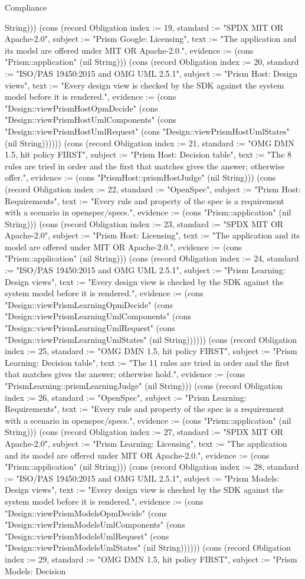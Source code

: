 \begin{lexlean}{Compliance}
\begin{semanticmodule}
{String))}) (cons (record Obligation {index := 19, standard := "SPDX MIT OR Apache-2.0", subject := "Prism Google: Licensing", text := "The application and its model are offered under MIT OR Apache-2.0.", evidence := (cons "Prism::application" (nil String))}) (cons (record Obligation {index := 20, standard := "ISO/PAS 19450:2015 and OMG UML 2.5.1", subject := "Prism Host: Design views", text := "Every design view is checked by the SDK against the system model before it is rendered.", evidence := (cons "Design::viewPrismHostOpmDecide" (cons "Design::viewPrismHostUmlComponents" (cons "Design::viewPrismHostUmlRequest" (cons "Design::viewPrismHostUmlStates" (nil String)))))}) (cons (record Obligation {index := 21, standard := "OMG DMN 1.5, hit policy FIRST", subject := "Prism Host: Decision table", text := "The 8 rules are tried in order and the first that matches gives the answer; otherwise offer.", evidence := (cons "PrismHost::prismHostJudge" (nil String))}) (cons (record Obligation {index := 22, standard := "OpenSpec", subject := "Prism Host: Requirements", text := "Every rule and property of the spec is a requirement with a scenario in openspec/specs.", evidence := (cons "Prism::application" (nil String))}) (cons (record Obligation {index := 23, standard := "SPDX MIT OR Apache-2.0", subject := "Prism Host: Licensing", text := "The application and its model are offered under MIT OR Apache-2.0.", evidence := (cons "Prism::application" (nil String))}) (cons (record Obligation {index := 24, standard := "ISO/PAS 19450:2015 and OMG UML 2.5.1", subject := "Prism Learning: Design views", text := "Every design view is checked by the SDK against the system model before it is rendered.", evidence := (cons "Design::viewPrismLearningOpmDecide" (cons "Design::viewPrismLearningUmlComponents" (cons "Design::viewPrismLearningUmlRequest" (cons "Design::viewPrismLearningUmlStates" (nil String)))))}) (cons (record Obligation {index := 25, standard := "OMG DMN 1.5, hit policy FIRST", subject := "Prism Learning: Decision table", text := "The 11 rules are tried in order and the first that matches gives the answer; otherwise hold.", evidence := (cons "PrismLearning::prismLearningJudge" (nil String))}) (cons (record Obligation {index := 26, standard := "OpenSpec", subject := "Prism Learning: Requirements", text := "Every rule and property of the spec is a requirement with a scenario in openspec/specs.", evidence := (cons "Prism::application" (nil String))}) (cons (record Obligation {index := 27, standard := "SPDX MIT OR Apache-2.0", subject := "Prism Learning: Licensing", text := "The application and its model are offered under MIT OR Apache-2.0.", evidence := (cons "Prism::application" (nil String))}) (cons (record Obligation {index := 28, standard := "ISO/PAS 19450:2015 and OMG UML 2.5.1", subject := "Prism Models: Design views", text := "Every design view is checked by the SDK against the system model before it is rendered.", evidence := (cons "Design::viewPrismModelsOpmDecide" (cons "Design::viewPrismModelsUmlComponents" (cons "Design::viewPrismModelsUmlRequest" (cons "Design::viewPrismModelsUmlStates" (nil String)))))}) (cons (record Obligation {index := 29, standard := "OMG DMN 1.5, hit policy FIRST", subject := "Prism Models: Decision }
\end{semanticmodule}
\end{lexlean}
